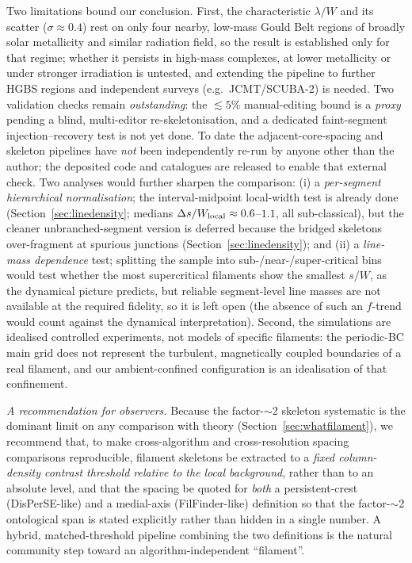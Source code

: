 \documentclass[usenatbib,twoside,twocolumn]{mnras}
\begin{document}
Two limitations bound our conclusion. First, the characteristic $\lambda/W$ and its scatter ($\sigma\approx0.4$) rest on only four nearby, low-mass Gould Belt regions of broadly solar metallicity and similar radiation field, so the result is established only for that regime; whether it persists in high-mass complexes, at lower metallicity or under stronger irradiation is untested, and extending the pipeline to further HGBS regions and independent surveys (e.g.\ JCMT/SCUBA-2) is needed. Two validation checks remain \emph{outstanding}: the $\lesssim5\%$ manual-editing bound is a \emph{proxy} pending a blind, multi-editor re-skeletonisation, and a dedicated faint-segment injection--recovery test is not yet done. To date the adjacent-core-spacing and skeleton pipelines have \emph{not} been independently re-run by anyone other than the author; the deposited code and catalogues are released to enable that external check. Two analyses would further sharpen the comparison: (i) a \emph{per-segment hierarchical normalisation}; the interval-midpoint local-width test is already done (Section~\ref{sec:linedensity}; medians $\Delta s/W_{\rm local}\approx0.6$--$1.1$, all sub-classical), but the cleaner unbranched-segment version is deferred because the bridged skeletons over-fragment at spurious junctions (Section~\ref{sec:linedensity}); and (ii) a \emph{line-mass dependence} test; splitting the sample into sub-/near-/super-critical bins would test whether the most supercritical filaments show the smallest $s/W$, as the dynamical picture predicts, but reliable segment-level line masses are not available at the required fidelity, so it is left open (the absence of such an $f$-trend would count against the dynamical interpretation). Second, the simulations are idealised controlled experiments, not models of specific filaments: the periodic-BC main grid does not represent the turbulent, magnetically coupled boundaries of a real filament, and our ambient-confined configuration is an idealisation of that confinement.

\smallskip\noindent\emph{A recommendation for observers.} Because the factor-$\sim$2 skeleton systematic is the dominant limit on any comparison with theory (Section~\ref{sec:whatfilament}), we recommend that, to make cross-algorithm and cross-resolution spacing comparisons reproducible, filament skeletons be extracted to a \emph{fixed column-density contrast threshold relative to the local background}, rather than to an absolute level, and that the spacing be quoted for \emph{both} a persistent-crest (DisPerSE-like) and a medial-axis (FilFinder-like) definition so that the factor-$\sim$2 ontological span is stated explicitly rather than hidden in a single number. A hybrid, matched-threshold pipeline combining the two definitions is the natural community step toward an algorithm-independent ``filament''.
\end{document}
